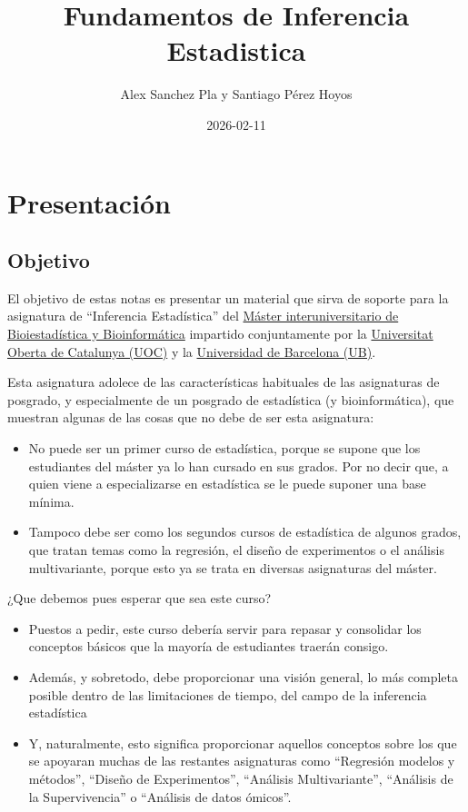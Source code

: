 \documentclass[
]{article}
\title{Fundamentos de Inferencia Estadistica}
\author{Alex Sanchez Pla y Santiago Pérez Hoyos}
\date{2026-02-11}
\providecommand{\tightlist}{%
  \setlength{\itemsep}{0pt}\setlength{\parskip}{0pt}}
\begin{document}
\maketitle

{
\setcounter{tocdepth}{2}
\tableofcontents
}
\section*{Presentación}\label{presentaciuxf3n}

\subsection*{Objetivo}\label{objetivo}

El objetivo de estas notas es presentar un material que sirva de soporte para la asignatura de ``Inferencia Estadística'' del \href{https://www.uoc.edu/es/estudios/masters/master-universitario-bioinformatica-bioestadistica}{Máster interuniversitario de Bioiestadística y Bioinformática} impartido conjuntamente por la \href{https://www.uoc.edu}{Universitat Oberta de Catalunya (UOC)} y la \href{https://www.ub.edu}{Universidad de Barcelona (UB)}.

Esta asignatura adolece de las características habituales de las asignaturas de posgrado, y especialmente de un posgrado de estadística (y bioinformática), que muestran algunas de las cosas que no debe de ser esta asignatura:

\begin{itemize}
\tightlist
\item
  No puede ser un primer curso de estadística, porque se supone que los estudiantes del máster ya lo han cursado en sus grados. Por no decir que, a quien viene a especializarse en estadística se le puede suponer una base mínima.
\item
  Tampoco debe ser como los segundos cursos de estadística de algunos grados, que tratan temas como la regresión, el diseño de experimentos o el análisis multivariante, porque esto ya se trata en diversas asignaturas del máster.
\end{itemize}

¿Que debemos pues esperar que sea este curso?

\begin{itemize}
\tightlist
\item
  Puestos a pedir, este curso debería servir para repasar y consolidar los conceptos básicos que la mayoría de estudiantes traerán consigo.
\item
  Además, y sobretodo, debe proporcionar una visión general, lo más completa posible dentro de las limitaciones de tiempo, del campo de la inferencia estadística
\item
  Y, naturalmente, esto significa proporcionar aquellos conceptos sobre los que se apoyaran muchas de las restantes asignaturas como ``Regresión modelos y métodos'', ``Diseño de Experimentos'', ``Análisis Multivariante'', ``Análisis de la Supervivencia'' o ``Análisis de datos ómicos''.
\end{itemize}
\end{document}
